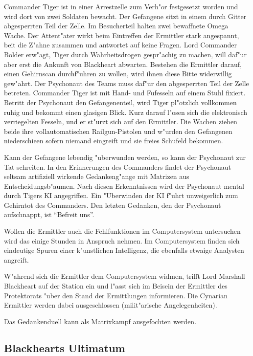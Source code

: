 Commander Tiger ist in einer Arrestzelle zum Verh"or festgesetzt worden und wird dort von zwei Soldaten bewacht. Der Gefangene sitzt in einem durch Gitter abgesperrten Teil der Zelle. Im Besucherteil halten zwei bewaffnete Omega Wache. Der Attent"ater wirkt beim Eintreffen der Ermittler stark angespannt, bei\3t die Z"ahne zusammen und antwortet auf keine Fragen. Lord Commander Bolder erw"agt, Tiger durch Wahrheitsdrogen gespr"achig zu machen, will daf"ur aber erst die Ankunft von Blackheart abwarten. Bestehen die Ermittler darauf, einen Gehirnscan durchf"uhren zu wollen, wird ihnen diese Bitte widerwillig gew"ahrt. Der Psychonaut des Teams muss daf"ur den abgesperrten Teil der Zelle betreten. Commander Tiger ist mit Hand- und Fu\3fesseln auf einem Stuhl fixiert. Betritt der Psychonaut den Gefangenenteil, wird Tiger pl"otzlich vollkommen ruhig und bekommt einen glasigen Blick. Kurz darauf l"osen sich die elektronisch verriegelten Fesseln, und er st"urzt sich auf den Ermittler. Die Wachen ziehen beide ihre vollautomatischen Railgun-Pistolen und w"urden den Gefangenen niederschie\3en sofern niemand eingreift und sie freies Schu\3feld bekommen.

Kann der Gefangene lebendig "uberwunden werden, so kann der Psychonaut zur Tat schreiten. In den Erinnerungen des Commanders findet der Psychonaut seltsam artifiziell wirkende Gedankeng"ange mit Matrizen aus Entscheidungsb"aumen. Nach diesen Erkenntnissen wird der Psychonaut mental durch Tigers KI angegriffen. Ein "Uberwinden der KI f"uhrt unweigerlich zum Gehirntot des Commanders. Den letzten Gedanken, den der Psychonaut aufschnappt, ist "`Befreit uns"'.

Wollen die Ermittler auch die Fehlfunktionen im Computersystem untersuchen wird das einige Stunden in Anspruch nehmen. Im Computersystem finden sich eindeutige Spuren einer k"unstlichen Intelligenz, die ebenfalls etwaige Analysten angreift.

W"ahrend sich die Ermittler dem Computersystem widmen, trifft Lord Marshall Blackheart auf der Station ein und l"asst sich im Beisein der Ermittler des Protektorats "uber den Stand der Ermittlungen informieren. Die Cynarian Ermittler werden dabei ausgeschlossen (milit"arische Angelegenheiten).

\begin{remarks}
Das Gedankenduell kann als Matrixkampf ausgefochten werden.
\end{remarks}

\subsection{Blackhearts Ultimatum}

